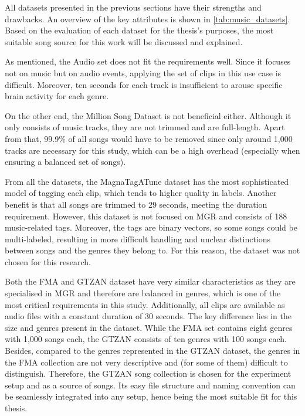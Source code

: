     All datasets presented in the previous sections have their strengths and drawbacks. An overview of the key attributes is shown in \autoref{tab:music_datasets}. Based on the evaluation of each dataset for the thesis's purposes, the most suitable song source for this work will be discussed and explained.\par
    As mentioned, the Audio set does not fit the requirements well. Since it focuses not on music but on audio events, applying the set of clips in this use case is difficult. Moreover, ten seconds for each track is insufficient to arouse specific brain activity for each genre. \par
    On the other end, the Million Song Dataset is not beneficial either. Although it only consists of music tracks, they are not trimmed and are full-length. Apart from that, 99.9\% of all songs would have to be removed since only around 1,000 tracks are necessary for this study, which can be a high overhead (especially when ensuring a balanced set of songs). \par
    From all the datasets, the MagnaTagATune dataset has the most sophisticated model of tagging each clip, which tends to higher quality in labels. Another benefit is that all songs are trimmed to 29 seconds, meeting the duration requirement. However, this dataset is not focused on \ac{MGR} and consists of 188 music-related tags. Moreover, the tags are binary vectors, so some songs could be multi-labeled, resulting in more difficult handling and unclear distinctions between songs and the genres they belong to. For this reason, the dataset was not chosen for this research.\par
    Both the \ac{FMA} and GTZAN dataset have very similar characteristics as they are specialised in \ac{MGR} and therefore are balanced in genres, which is one of the most critical requirements in this study. Additionally, all clips are available as audio files with a constant duration of 30 seconds. The key difference lies in the size and genres present in the dataset. While the \ac{FMA} set contains eight genres with 1,000 songs each, the GTZAN consists of ten genres with 100 songs each. Besides, compared to the genres represented in the GTZAN dataset, the genres in the \ac{FMA} collection are not very descriptive and (for some of them) difficult to distinguish. Therefore, the GTZAN song collection is chosen for the experiment setup and as a source of songs. Its easy file structure and naming convention can be seamlessly integrated into any setup, hence being the most suitable fit for this thesis.


